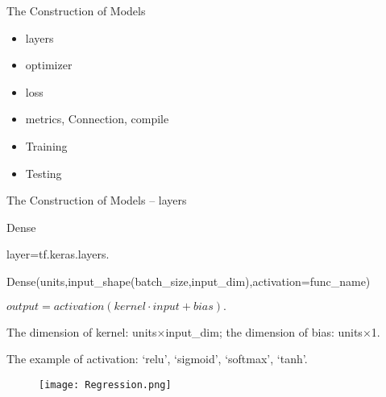 \documentclass{beamer}
\begin{document}
\begin{frame}{The Construction of Models}
\begin{itemize}
  \item layers
  \item optimizer
  \item loss
  \item metrics, Connection, compile
  \item Training
  \item Testing
\end{itemize}

\end{frame}


\begin{frame}{The Construction of Models -- layers}
\begin{block}{Dense}
{\color{blue} \small{layer=tf.keras.layers.

Dense(units,input\_shape(batch\_size,input\_dim),activation=func\_name)}}

\centerline{$output=activation(kernel\cdot input+bias).$}

The dimension of kernel: units$\times$input\_dim; the dimension of bias: units$\times$1.

The example of activation: `relu', `sigmoid', `softmax', `tanh'.
\end{block}
\begin{figure}
  \centering
  \texttt{[image: Regression.png]}\\
\end{figure}

\end{frame}
\end{document}

